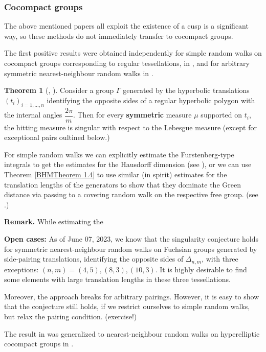 \documentclass[11pt]{amsart}
\theoremstyle{definition}
\newtheorem{theorem}{Theorem}[section]
\begin{document}
	\subsubsection{Cocompact groups} 
	
	The above mentioned papers all exploit the existence of a cusp is a significant way, so these methods do not immediately transfer to cocompact groups. 
	
	The first positive results were obtained independently for simple random walks on cocompact groups corresponding to regular tessellations, in \cite{Carrasco2019OnTS}, and for arbitrary symmetric nearest-neighbour random walks in \cite{10.1093/imrn/rnaa213}.
	
	\begin{theorem}[\cite{Carrasco2019OnTS}, \cite{10.1093/imrn/rnaa213}]
		Consider a group $\Gamma$ generated by the hyperbolic translations $(t_i)_{i = 1, \dots, n}$ identifying the opposite sides of a regular hyperbolic polygon with the internal angles $\dfrac{2\pi}{m}$. Then for every \textbf{symmetric} measure $\mu$ supported on $t_i$, the hitting measure is singular with respect to the Lebesgue measure (except for exceptional pairs oultined below.)  
	\end{theorem}
	
	For simple random walks we can explicitly estimate the Furstenberg-type integrals to get the estimates for the Hausdorff dimension (see \cite{Carrasco2019OnTS}), or we can use Theorem \ref{BHMTheorem 1.4} to use similar (in spirit) estimates for the translation lengths of the generators to show that they dominate the Green distance via passing to a covering random walk on the respective free group. (see \cite{10.1093/imrn/rnaa213}.)
	
	\textbf{Remark.} While estimating the 
	
	\textbf{Open cases:} As of June 07, 2023, we know that the singularity conjecture holds for symmetric nearest-neighbour random walks on Fuchsian groups generated by side-pairing translations, identifying the opposite sides of $\Delta_{n, m}$, with three exceptions: $(n, m) = (4, 5), (8, 3), (10, 3)$. It is highly desirable to find some elements with large translation lengths in these three tessellations.
	
	Moreover, the approach breaks for arbitrary pairings. However, it is easy to show that the conjecture still holds, if we restrict ourselves to simple random walks, but relax the pairing condition. (exercise!)
	
	The result in \cite{10.1093/imrn/rnaa213} was generalized to nearest-neighbour random walks on hyperelliptic cocompact groups in \cite{kosenko_tiozzo_2022}.
	
\end{document}
